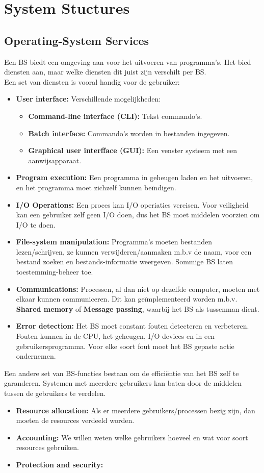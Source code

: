 
\section{System Stuctures}

\subsection{Operating-System Services}
Een BS biedt een omgeving aan voor het uitvoeren van programma's. Het bied diensten aan, maar welke diensten dit juist zijn verschilt per BS. \\
Een set van diensten is vooral handig voor de gebruiker:
\begin{itemize}
	\item \textbf{User interface: } Verschillende mogelijkheden:
		\begin{itemize}
			\item \textbf{Command-line interface (CLI): } Tekst commando's.
			\item \textbf{Batch interface: } Commando's worden in bestanden ingegeven.
			\item \textbf{Graphical user interfface (GUI): } Een venster systeem met een aanwijsapparaat.
		\end{itemize}
	\item \textbf{Program execution: } Een programma in geheugen laden en het uitvoeren, en het programma moet zichzelf kunnen beïndigen.
	\item \textbf{I/O Operations: } Een proces kan I/O operiaties vereisen. Voor veiligheid kan een gebruiker zelf geen I/O doen, dus het BS moet middelen voorzien om I/O te doen.
	\item \textbf{File-system manipulation: } Programma's moeten bestanden lezen/schrijven, ze kunnen verwijderen/aanmaken m.b.v de naam, voor een bestand zoeken en bestands-informatie weergeven. Sommige BS laten toestemming-beheer toe.
	\item \textbf{Communications: } Processen, al dan niet op dezelfde computer, moeten met elkaar kunnen communiceren. Dit kan geïmplementeerd worden m.b.v. \textbf{Shared memory} of \textbf{Message passing}, waarbij het BS als tussenman dient.
	\item \textbf{Error detection: } Het BS moet constant fouten detecteren en verbeteren. Fouten kunnen in de CPU, het geheugen, I/O devices en in een gebruikersprogramma. Voor elke soort fout moet het BS gepaste actie ondernemen.
\end{itemize}
Een andere set van BS-functies bestaan om de effici\"{e}ntie van het BS zelf te garanderen. Systemen met meerdere gebruikers kan baten door de middelen tussen de gebruikers te verdelen.

\begin{itemize}
	\item \textbf{Resource allocation: } Als er meerdere gebruikers/processen bezig zijn, dan moeten de resources verdeeld worden. 
	\item \textbf{Accounting: } We willen weten welke gebruikers hoeveel en wat voor soort resources gebruiken.
	\item \textbf{Protection and security: }
\end{itemize}